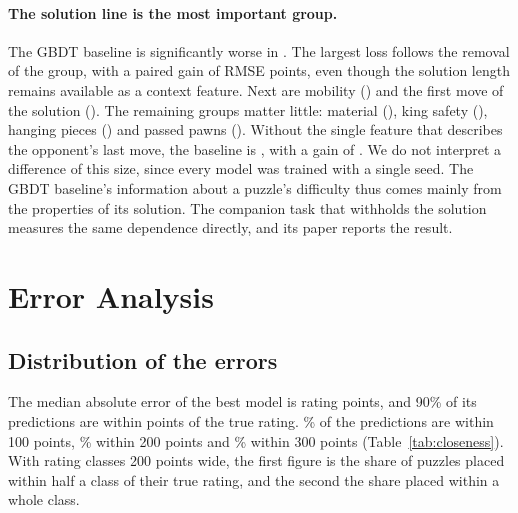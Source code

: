 \documentclass[11pt]{article}
\begin{document}
\paragraph{The solution line is the most important group.}
The GBDT baseline is significantly worse in
. The largest loss follows the removal of
the  group, with a paired gain of
 RMSE points, even though the solution
length remains available as a context feature. Next are mobility
() and the first move of the
solution (). The remaining groups
matter little: material (), king
safety (), hanging pieces
() and passed pawns
(). Without the single feature that
describes the opponent's last move, the baseline is
, with a gain of
. We do not interpret a difference of
this size, since every model was trained with a single seed. The GBDT
baseline's information about a puzzle's difficulty thus comes mainly from the
properties of its solution. The companion task that withholds the solution
measures the same dependence directly, and its paper reports the result.
\fi
\fi

\section{Error Analysis}
\label{sec:error}



\iflook
\subsection{Distribution of the errors}

The median absolute error of the best model is  rating
points, and 90\% of its predictions are within  points of
the true rating. \% of the predictions are within
100 points, \% within 200 points and
\% within 300 points (Table~\ref{tab:closeness}).
With rating classes 200 points wide, the first figure is the share of
puzzles placed within half a class of their true rating, and the second the
share placed within a whole class.
\end{document}
